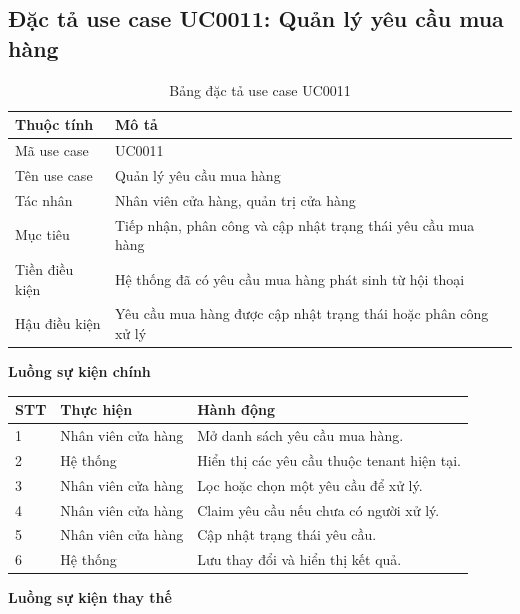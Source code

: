 \documentclass[../DoAn.tex]{subfiles}
\begin{document}
\subsection{Đặc tả use case UC0011: Quản lý yêu cầu mua hàng}
\label{subsection:2.3.6}

\begin{table}[H]
\centering
\caption{Bảng đặc tả use case UC0011}
\label{table:uc0011}
\begin{tabular}{|p{}|p{}|}
\hline
\textbf{Thuộc tính} & \textbf{Mô tả} \\
\hline
Mã use case & UC0011 \\
\hline
Tên use case & Quản lý yêu cầu mua hàng \\
\hline
Tác nhân & Nhân viên cửa hàng, quản trị cửa hàng \\
\hline
Mục tiêu & Tiếp nhận, phân công và cập nhật trạng thái yêu cầu mua hàng \\
\hline
Tiền điều kiện & Hệ thống đã có yêu cầu mua hàng phát sinh từ hội thoại \\
\hline
Hậu điều kiện & Yêu cầu mua hàng được cập nhật trạng thái hoặc phân công xử lý \\
\hline
\end{tabular}
\end{table}

\textbf{Luồng sự kiện chính}

\begin{table}[H]
\centering
\begin{tabular}{|p{}|p{}|p{}|}
\hline
\textbf{STT} & \textbf{Thực hiện} & \textbf{Hành động} \\
\hline
1 & Nhân viên cửa hàng & Mở danh sách yêu cầu mua hàng. \\
\hline
2 & Hệ thống & Hiển thị các yêu cầu thuộc tenant hiện tại. \\
\hline
3 & Nhân viên cửa hàng & Lọc hoặc chọn một yêu cầu để xử lý. \\
\hline
4 & Nhân viên cửa hàng & Claim yêu cầu nếu chưa có người xử lý. \\
\hline
5 & Nhân viên cửa hàng & Cập nhật trạng thái yêu cầu. \\
\hline
6 & Hệ thống & Lưu thay đổi và hiển thị kết quả. \\
\hline
\end{tabular}
\end{table}

\textbf{Luồng sự kiện thay thế}
\end{document}
